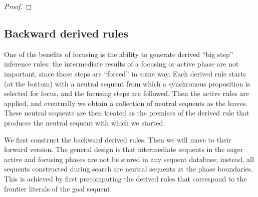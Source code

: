 \begin{proof}
\end{proof}

\subsection{Backward derived rules}

One of the benefits of focusing is the ability to generate derived ``big step''
inference rules: the intermediate results of a focusing or active phase are not
important, since those steps are ``forced'' in some way. Each derived rule
starts (at the bottom) with a neutral sequent from which a synchronous
proposition is selected for focus, and the focusing steps are followed. Then the
active rules are applied, and eventually we obtain a collection of neutral
sequents as the leaves. These neutral sequents are then treated as the premises
of the derived rule that produces the neutral sequent with which we started.

We first construct the backward derived rules. Then we will move to their
forward version. The general design is that intermediate sequents in the eager
active and focusing phases are not be stored in any sequent database; instead,
all sequents constructed during search are neutral sequents at the phase
boundaries. This is achieved by first precomputing the derived rules that
correspond to the frontier literals of the goal sequent.

